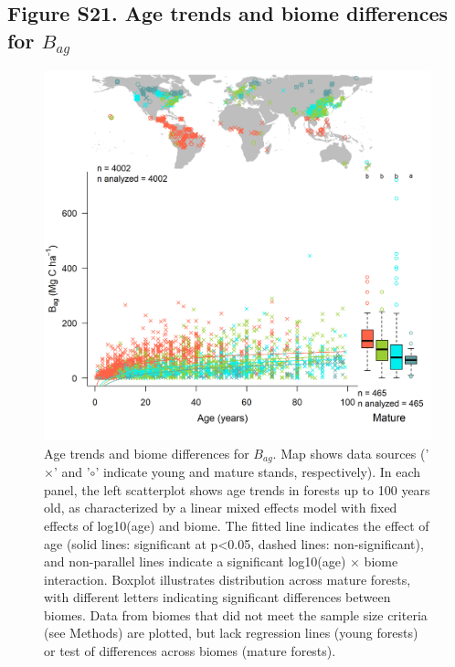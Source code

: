 \documentclass[
]{article}
\begin{document}
\newpage

\hypertarget{figure-s21.-age-trends-and-biome-differences-for-b_ag}{%
\subsection{\texorpdfstring{Figure S21. Age trends and biome differences
for
\(B_{ag}\)}{Figure S21. Age trends and biome differences for B\_\{ag\}}}\label{figure-s21.-age-trends-and-biome-differences-for-b_ag}}

\begin{figure}[H]

{\centering \includegraphics[width=1\linewidth]{tables_figures/age_trends/biomass_ag_with_map} 

}

\caption{Age trends and biome differences for $B_{ag}$. Map shows data sources ('$\times$' and '$\circ$' indicate young and mature stands, respectively). In each panel, the left scatterplot shows age trends in forests up to 100 years old, as characterized by a linear mixed effects model with fixed effects of log10(age) and biome. The fitted line indicates the effect of age (solid lines: significant at p<0.05, dashed lines: non-significant), and non-parallel lines indicate a significant log10(age) $\times$ biome interaction. Boxplot illustrates distribution across mature forests, with different letters indicating significant differences between biomes. Data from biomes that did not meet the sample size criteria (see Methods) are plotted, but lack regression lines (young forests) or test of differences across biomes (mature forests).}\label{fig:unnamed-chunk-24}
\end{figure}
\end{document}
